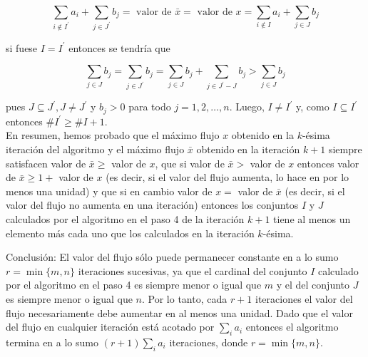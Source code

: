 \documentclass[10pt]{article}
\begin{document}
$$
\sum_{i \notin I^{\prime}} a_{i}+\sum_{j \in J^{\prime}} b_{j}=\text { valor de } \bar{x}=\text { valor de } x=\sum_{i \notin I} a_{i}+\sum_{j \in J} b_{j}
$$

si fuese $I=I^{\prime}$ entonces se tendría que

$$
\sum_{j \in J} b_{j}=\sum_{j \in J^{\prime}} b_{j}=\sum_{j \in J} b_{j}+\sum_{j \in J^{\prime}-J} b_{j}>\sum_{j \in J} b_{j}
$$

pues $J \subseteq J^{\prime}, J \neq J^{\prime}$ y $b_{j}>0$ para todo $j=1,2, \ldots, n$. Luego, $I \neq I^{\prime}$ y, como $I \subseteq I^{\prime}$ entonces $\# I^{\prime} \geq \# I+1$.\\
En resumen, hemos probado que el máximo flujo $x$ obtenido en la $k$-ésima iteración del algoritmo y el máximo flujo $\bar{x}$ obtenido en la iteración $k+1$ siempre satisfacen valor de $\bar{x} \geq$ valor de $x$, que si valor de $\bar{x}>$ valor de $x$ entonces valor de $\bar{x} \geq 1+$ valor de $x$ (es decir, si el valor del flujo aumenta, lo hace en por lo menos una unidad) y que si en cambio valor de $x=$ valor de $\bar{x}$ (es decir, si el valor del flujo no aumenta en una iteración) entonces los conjuntos $I$ y $J$ calculados por el algoritmo en el paso 4 de la iteración $k+1$ tiene al menos un elemento más cada uno que los calculados en la iteración $k$-ésima.

Conclusión: El valor del flujo sólo puede permanecer constante en a lo sumo $r=\min \{m, n\}$ iteraciones sucesivas, ya que el cardinal del conjunto $I$ calculado por el algoritmo en el paso 4 es siempre menor o igual que $m$ y el del conjunto $J$ es siempre menor o igual que $n$. Por lo tanto, cada $r+1$ iteraciones el valor del flujo necesariamente debe aumentar en al menos una unidad. Dado que el valor del flujo en cualquier iteración está acotado por $\sum_{i} a_{i}$ entonces el algoritmo termina en a lo sumo $(r+1) \sum_{i} a_{i}$ iteraciones, donde $r=\min \{m, n\}$.
\end{document}
